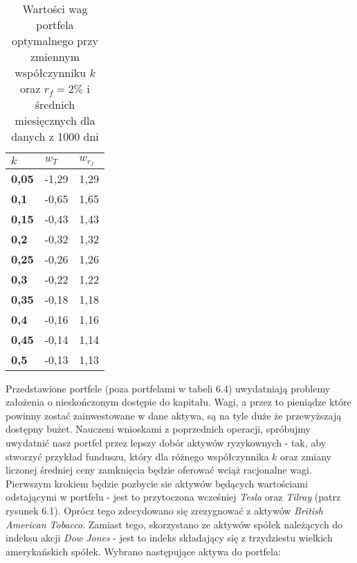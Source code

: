 \documentclass[magister]{dyplom}
\begin{document}
\begin{table}[ht]
	\centering
	\caption{Wartości wag portfela optymalnego przy zmiennym współczynniku $k$ oraz $r_f = 2\%$ i średnich miesięcznych dla danych z 1000 dni}
	\begin{tabular}{|l|l|l|}
		\hline
		\textbf{$k$} & \textbf{$w_T$} & \textbf{$w_{r_f}$} \\ \hline
		\textbf{0,05}                                             & -1,29         & 1,29           \\ \hline
		\textbf{0,1}                                              & -0,65         & 1,65           \\ \hline
		\textbf{0,15}                                             & -0,43         & 1,43           \\ \hline
		\textbf{0,2}                                              & -0,32         & 1,32           \\ \hline
		\textbf{0,25}                                             & -0,26         & 1,26           \\ \hline
		\textbf{0,3}                                              & -0,22         & 1,22           \\ \hline
		\textbf{0,35}                                             & -0,18         & 1,18           \\ \hline
		\textbf{0,4}                                              & -0,16         & 1,16           \\ \hline
		\textbf{0,45}                                             & -0,14         & 1,14           \\ \hline
		\textbf{0,5}                                              & -0,13         & 1,13           \\ \hline
	\end{tabular}
\end{table}
\newpage
Przedstawione portfele (poza portfelami w tabeli 6.4) uwydatniają problemy założenia o nieskończonym dostępie do kapitału.\cite{simplifiedmarkowitz} Wagi, a przez to pieniądze które powinny zostać zainwestowane w dane aktywa, są na tyle duże że przewyższają dostępny bużet.
Nauczeni wnioskami z poprzednich operacji, spróbujmy uwydatnić nasz portfel przez lepszy dobór aktywów ryzykownych - tak, aby stworzyć przykład funduszu, który dla różnego współczynnika $k$ oraz zmiany liczonej średniej ceny zamknięcia będzie oferować wciąż racjonalne wagi. Pierwszym krokiem będzie pozbycie sie aktywów będących wartościami odstającymi w portfelu - jest to przytoczona wcześniej \textit{Tesla} oraz \textit{Tilray} (patrz rysunek 6.1). Oprócz tego zdecydowano się zrezygnować z aktywów \textit{British American Tobacco}. Zamiast tego, skorzystano ze aktywów spółek należących do indeksu akcji \textit{Dow Jones} - jest to indeks składający się z trzydziestu wielkich amerykańskich spółek. Wybrano następujące aktywa do portfela:
\end{document}
